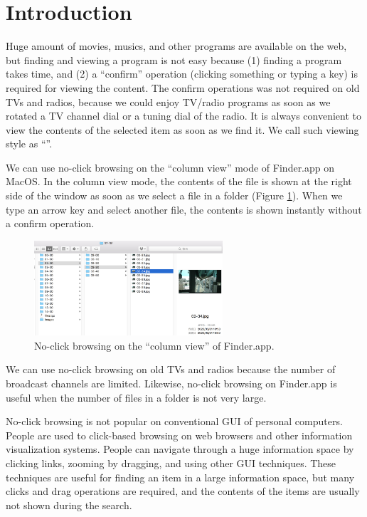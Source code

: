 \documentclass[conference]{IEEEtran}
\begin{document}

\section{Introduction}

% 

Huge amount of movies, musics, and other programs are available on the web, but
finding and viewing a program is not easy because
(1) finding a program takes time, and
(2) a ``confirm'' operation (clicking something or typing a key)
is required for viewing the content.
%
The confirm operations was not required on old TVs and radios,
because we could enjoy TV/radio programs
as soon as we rotated a TV channel dial or a tuning dial of the radio.
%
It is always convenient to view the contents of the selected item
as soon as we find it.
We call such viewing style as ``\textbf{}''.

We can use no-click browsing on the ``column view'' mode of Finder.app on MacOS.
In the column view mode, 
the contents of the file is shown at the right side of the window
as soon as we select a file in a folder (Figure \ref{noclickfinder}).
When we type an arrow key and select another file,
the contents is shown instantly without a confirm operation.

\begin{figure}[H]
  \centerline{\includegraphics[width=70mm,bb=0 0 839 423]{figures/10d7ca6c55aa93ebcdab799246e4c087.jpg}}
  \caption{No-click browsing on the ``column view'' of Finder.app.}
  \label{noclickfinder}
\end{figure}

We can use no-click browsing on old TVs and radios because the number of
broadcast channels are limited.
Likewise, no-click browsing on Finder.app is useful
when the number of files in a folder is not very large.

No-click browsing is not popular on conventional GUI of personal computers.
People are used to click-based browsing on web browsers and other
information visualization systems.
People can navigate through a huge information space by
clicking links, zooming by dragging, and using other GUI techniques.
These techniques are useful for finding an item in a large information space,
but many clicks and drag operations are required,
and the contents of the items are usually not shown during the search.
\end{document}
